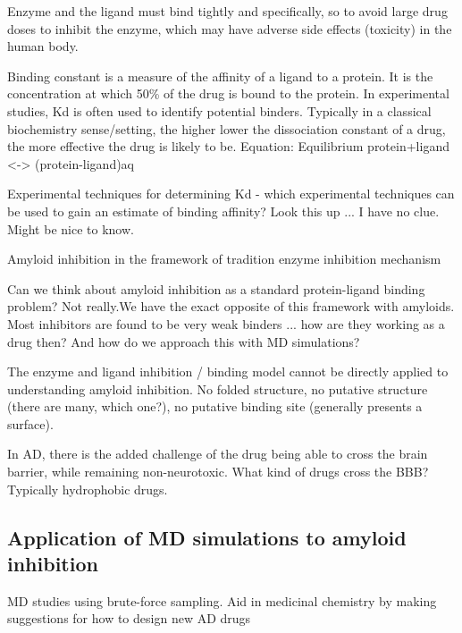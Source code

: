   \2 Enzyme and the ligand must bind tightly and specifically, so to avoid large drug doses to inhibit the enzyme, which may have adverse side effects (toxicity) in the human body.

  \2 Binding constant is a measure of the affinity of a ligand to a protein. It is the concentration at which 50\% of the drug is bound to the protein. In experimental studies, Kd is often used to identify potential binders. Typically in a classical biochemistry sense/setting, the higher lower the dissociation constant of a drug, the more effective the drug is likely to be.
    \3 Equation: Equilibrium protein+ligand <-> (protein-ligand)aq

  \2 Experimental techniques for determining Kd - which experimental techniques can be used to gain an estimate of binding affinity?
   \3 Look this up ... I have no clue.  Might be nice to know.

  \2 Amyloid inhibition in the framework of tradition enzyme inhibition mechanism

    \3 Can we think about amyloid inhibition as a standard protein-ligand binding problem? Not really.We have the exact opposite of this framework with amyloids. Most inhibitors are found to be very weak binders ... how are they working as a drug then? And how do we approach this with MD simulations?

    \3 The enzyme and ligand inhibition / binding model cannot be directly applied to understanding amyloid inhibition.  No folded structure, no putative structure (there are many, which one?), no putative binding site (generally presents a surface).

    \3 In AD, there is the added challenge of the drug being able to cross the brain barrier, while remaining non-neurotoxic.  What kind of drugs cross the BBB?  Typically hydrophobic drugs.
    
\subsection{Application of MD simulations to amyloid inhibition}
MD studies using brute-force sampling. Aid in medicinal chemistry by making suggestions for how to design new AD drugs

